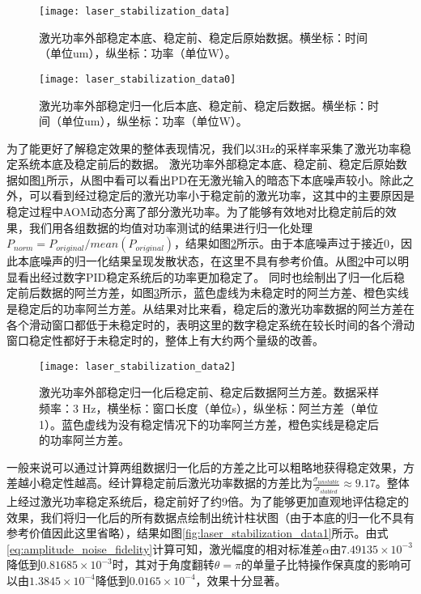 \begin{figure}
    \centering
    \texttt{[image: laser\_stabilization\_data]}
    \caption[激光功率外部稳定原始数据]{激光功率外部稳定本底、稳定前、稳定后原始数据。横坐标：时间（单位um），纵坐标：功率（单位W）。\label{fig:laser_stabilization_data}}
\end{figure}

\begin{figure}
    \centering
    \texttt{[image: laser\_stabilization\_data0]}
    \caption[激光功率外部稳定归一化后数据]{激光功率外部稳定归一化后本底、稳定前、稳定后数据。横坐标：时间（单位um），纵坐标：功率（单位W）。\label{fig:laser_stabilization_data0}}
\end{figure}


为了能更好了解稳定效果的整体表现情况，我们以3Hz的采样率采集了激光功率稳定系统本底及稳定前后的数据。
激光功率外部稳定本底、稳定前、稳定后原始数据如图\ref{fig:laser_stabilization_data}所示，从图中看可以看出PD在无激光输入的暗态下本底噪声较小。除此之外，可以看到经过稳定后的激光功率小于稳定前的激光功率，这其中的主要原因是稳定过程中AOM动态分离了部分激光功率。为了能够有效地对比稳定前后的效果，我们用各组数据的均值对功率测试的结果进行归一化处理$P_{norm}=P_{original}/mean(P_{original})$，结果如图\ref{fig:laser_stabilization_data0}所示。由于本底噪声过于接近0，因此本底噪声的归一化结果呈现发散状态，在这里不具有参考价值。从图\ref{fig:laser_stabilization_data0}中可以明显看出经过数字PID稳定系统后的功率更加稳定了。
同时也绘制出了归一化后稳定前后数据的阿兰方差，如图\ref{fig:laser_stabilization_data2}所示，蓝色虚线为未稳定时的阿兰方差、橙色实线是稳定后的功率阿兰方差。从结果对比来看，稳定后的激光功率数据的阿兰方差在各个滑动窗口都低于未稳定时的，表明这里的数字稳定系统在较长时间的各个滑动窗口稳定性都好于未稳定时的，整体上有大约两个量级的改善。


\begin{figure}
    \centering
    \texttt{[image: laser\_stabilization\_data2]}
    \caption[激光功率外部稳定阿兰方差对比数据]{激光功率外部稳定归一化后稳定前、稳定后数据阿兰方差。数据采样频率：3 Hz，横坐标：窗口长度（单位s），纵坐标：阿兰方差（单位1）。蓝色虚线为没有稳定情况下的功率阿兰方差，橙色实线是稳定后的功率阿兰方差。\label{fig:laser_stabilization_data2}}
\end{figure}

一般来说可以通过计算两组数据归一化后的方差之比可以粗略地获得稳定效果，方差越小稳定性越高。经计算稳定前后激光功率数据的方差比为$\frac{\sigma_{unstable}}{\sigma_{stabled}}\approx 9.17$。整体上经过激光功率稳定系统后，稳定前好了约9倍。为了能够更加直观地评估稳定的效果，我们将归一化后的所有数据点绘制出统计柱状图（由于本底的归一化不具有参考价值因此这里省略），结果如图\ref{fig:laser_stabilization_data1}所示。由式\eqref{eq:amplitude_noise_fidelity}计算可知，激光幅度的相对标准差$\alpha$由$7.49135\times 10^{-3}$降低到$0.81685\times 10^{-3}$时，其对于角度翻转$\theta=\pi$的单量子比特操作保真度的影响可以由$1.3845\times 10^{-4}$降低到$0.0165\times 10^{-4}$，效果十分显著。

